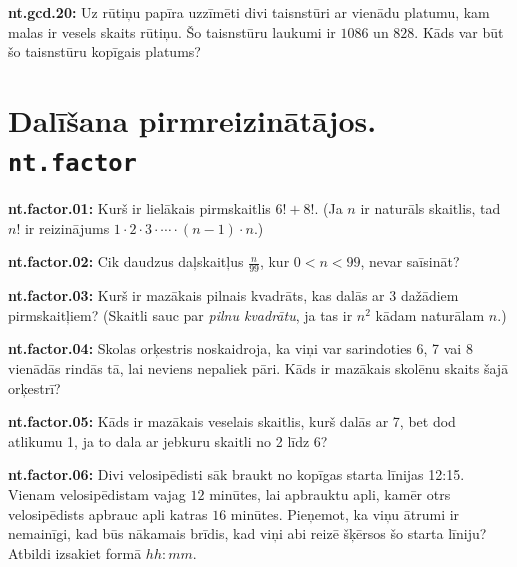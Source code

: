 \documentclass[11pt]{article}
\newenvironment{uzdevums}[1][\unskip]{%
\vspace{3mm}
\noindent
\textbf{#1:}
\noindent}
{}
\begin{document}
\begin{uzdevums}[nt.gcd.20]
Uz rūtiņu papīra uzzīmēti divi taisnstūri ar vienādu platumu, kam malas ir vesels skaits rūtiņu. 
Šo taisnstūru laukumi ir $1086$ un $828$. Kāds var būt šo taisnstūru kopīgais platums? 
\end{uzdevums}








\section{Dalīšana pirmreizinātājos. \texttt{nt.factor}}


\begin{uzdevums}[nt.factor.01]
Kurš ir lielākais pirmskaitlis $6! + 8!$. (Ja $n$ ir naturāls skaitlis, tad $n!$ ir reizinājums 
$1\cdot 2\cdot 3\cdot \cdots \cdot (n-1)\cdot n$.)
\end{uzdevums}


\begin{uzdevums}[nt.factor.02]
Cik daudzus daļskaitļus $\frac{n}{99}$, kur $0<n<99$, nevar saīsināt? 
\end{uzdevums}


\begin{uzdevums}[nt.factor.03]
Kurš ir mazākais pilnais kvadrāts, kas dalās ar 3 dažādiem pirmskaitļiem? (Skaitli sauc par {\em pilnu kvadrātu}, ja tas ir $n^2$ kādam naturālam $n$.)
\end{uzdevums}

\begin{uzdevums}[nt.factor.04]
Skolas orķestris noskaidroja, ka viņi var sarindoties 6, 7 vai 8 vienādās rindās tā, lai neviens nepaliek pāri. 
Kāds ir mazākais skolēnu skaits šajā orķestrī?
\end{uzdevums}

\begin{uzdevums}[nt.factor.05]
Kāds ir mazākais veselais skaitlis, kurš dalās ar 7, bet dod atlikumu 1, ja to dala ar jebkuru skaitli no 2 līdz 6? 
\end{uzdevums}

\begin{uzdevums}[nt.factor.06]
Divi velosipēdisti sāk braukt no kopīgas starta līnijas 12:15. Vienam velosipēdistam vajag $12$ minūtes, lai apbrauktu apli, 
kamēr otrs velosipēdists apbrauc apli katras $16$ minūtes. Pieņemot, ka viņu ātrumi ir nemainīgi, kad būs nākamais brīdis, kad 
viņi abi reizē šķērsos šo starta līniju? Atbildi izsakiet formā $hh:mm$. 
\end{uzdevums}
\end{document}
